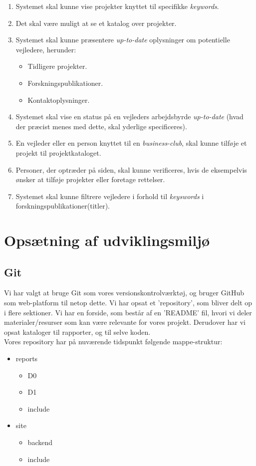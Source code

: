\documentclass[11pt]{article}
\begin{document}
\begin{enumerate}
  \item Systemet skal kunne vise projekter knyttet til specifikke \textit{keywords}.
  \item Det skal være muligt at se et katalog over projekter.
  \item Systemet skal kunne præsentere \textit{up-to-date} oplysninger om potentielle vejledere, herunder:
  \begin{itemize}
    \item Tidligere projekter.
    \item Forskningspublikationer.
    \item Kontaktoplysninger.
  \end{itemize}
  \item Systemet skal vise en status på en vejleders arbejdsbyrde \textit{up-to-date} (hvad der præcist menes med dette, skal yderlige specificeres).
  \item En vejleder eller en person knyttet til en \textit{business-club}, skal kunne tilføje et projekt til projektkataloget.
  \item Personer, der optræder på siden, skal kunne verificeres, hvis de eksempelvis ønsker at tilføje projekter eller foretage rettelser.
	\item Systemet skal kunne filtrere vejledere i forhold til \textit{keyswords} i forskningspublikationer(titler). 
\end{enumerate}

\section{Opsætning af udviklingsmiljø}
\subsection{Git}
Vi har valgt at bruge Git som vores versionskontrolværktøj, og bruger GitHub som web-platform til netop dette.
Vi har opsat et 'repository', som bliver delt op i flere sektioner. Vi har en forside, som består af en 'README' fil, hvori vi deler materialer/resurser som kan være relevante for vores projekt.
Derudover har vi opsat kataloger til rapporter, og til selve koden. \\
Vores repository har på nuværende tidspunkt følgende mappe-struktur:
\begin{itemize}
\item reports
  \begin{itemize}
  \item D0
  \item D1
  \item include
  \end{itemize}
\item site
  \begin{itemize}
  \item backend
  \item include
  \end{itemize}
\end{itemize}
\end{document}
